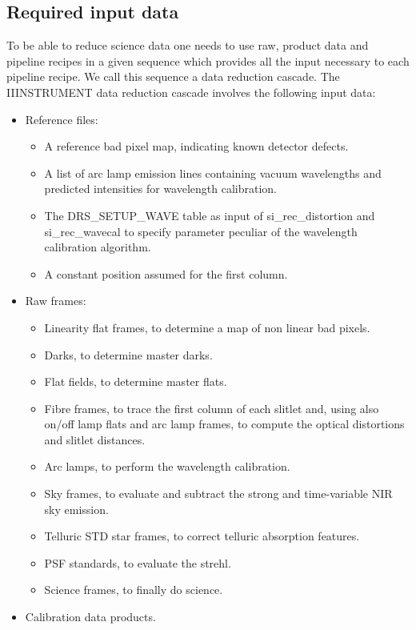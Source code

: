 \subsection{Required input data}
To be able to reduce science data one needs to use raw, product data and 
pipeline recipes in a given sequence which provides all the input necessary 
to each pipeline recipe. We call this sequence a data reduction cascade. 
The IIINSTRUMENT data reduction cascade involves the following input data:
\begin{itemize}
\item Reference files:
\begin{itemize}
\item A reference bad pixel map, indicating known detector defects.
\item A list of arc lamp emission lines containing vacuum wavelengths and 
predicted intensities for wavelength calibration.
\item The DRS\_SETUP\_WAVE table as input of si\_rec\_distortion and 
      si\_rec\_wavecal to specify parameter peculiar of the wavelength 
      calibration algorithm.
\item A constant position assumed for the first column.
\end{itemize}
\item Raw frames:
\begin{itemize}
\item Linearity flat frames, to determine a map of non linear bad pixels. 
\item Darks, to determine master darks.
\item Flat fields, to determine master flats. 
\item Fibre frames, to trace the first column of each slitlet and, using also 
on/off lamp flats and arc lamp frames, to compute the optical distortions 
and slitlet distances.
\item Arc lamps, to perform the wavelength calibration.
\item Sky frames, to evaluate and subtract the strong and time-variable NIR 
sky emission.
\item Telluric STD star frames, to correct telluric absorption features.
\item PSF standards, to evaluate the strehl.
\item Science frames, to finally do science.
\end{itemize}
\item Calibration data products.
\begin{itemize}

\end{itemize}
\end{itemize}
